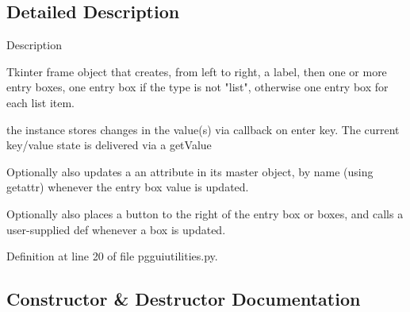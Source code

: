 \subsection{Detailed Description}
\begin{DoxyVerb}Description

Tkinter frame object that creates,
from left to right, a label, then 
one or more entry boxes, one entry box 
if the type is not "list", otherwise one 
entry box for each list item.

the instance stores changes in the value(s)
via callback on enter key.  The current
key/value state is delivered via a getValue


Optionally also updates a an attribute
in its master object, by name (using getattr)
whenever the entry box value is updated.

Optionally also places a button to the right
of the entry box or boxes, and calls a user-supplied
def whenever a box is updated.\end{DoxyVerb}
 

Definition at line 20 of file pgguiutilities.\+py.



\subsection{Constructor \& Destructor Documentation}
